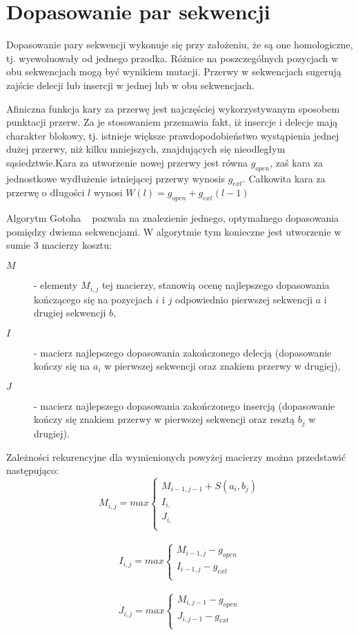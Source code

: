 \documentclass[a4paper,10pt]{article}
\begin{document}
	\section{Dopasowanie par sekwencji}

	Dopasowanie pary sekwencji wykonuje się przy założeniu, że są one homologiczne, tj. wyewoluowały od jednego przodka. Różnice na poszczególnych pozycjach w obu sekwencjach mogą być wynikiem mutacji. Przerwy w sekwencjach sugerują zajście delecji lub insercji w jednej lub w obu sekwencjach.

	Afiniczna funkcja kary za przerwę jest najczęściej wykorzystywanym sposobem punktacji przerw. Za je stosowaniem przemawia fakt, iż insercje i delecje mają charakter blokowy, tj. istnieje większe prawdopodobieństwo wystąpienia jednej dużej przerwy, niż kilku mniejszych, znajdujących się nieodległym sąsiedztwie.Kara za utworzenie nowej przerwy jest równa $g_{open}$, zaś kara za jednostkowe wydłużenie istniejącej przerwy wynosis $g_{ext}$. Całkowita kara za przerwę o długości $l$ wynosi \mbox{$W(l) = g_{open} + g_{ext}(l - 1)$}

	Algorytm Gotoha ~\cite{gotoh} pozwala na znalezienie jednego, optymalnego dopasowania  pomiędzy dwiema sekwencjami. W algorytmie tym konieczne jest utworzenie w sumie 3 macierzy kosztu:
	\begin{description}
	\item[$M$]
	 - elementy $M_{i,j}$ tej macierzy, stanowią ocenę najlepszego dopasowania kończącego się na pozycjach $i$ i $j$ odpowiednio pierwszej sekwencji $a$ i drugiej sekwencji $b$,
	\item[$I$]
	 - macierz najlepszego dopasowania zakończonego delecją (dopasowanie kończy się na $a_i$ w pierwszej sekwencji oraz znakiem przerwy w drugiej),
	\item[$J$]
	 - macierz najlepszego dopasowania zakończonego insercją (dopasowanie kończy się znakiem przerwy w pierwszej sekwencji oraz resztą $b_j$ w drugiej).
	\end{description}
	Zależności rekurencyjne dla wymienionych powyżej macierzy można przedstawić następująco:
	\[
		M_{i,j} = max \left\{
			\begin{array}{ll}
				M_{i-1, j-1} + S(a_i, b_j)\\
				I_{i, }\\
				J_{i, }\\
			\end{array} \right.
	\]\\
	\[
		I_{i,j} = max \left\{
			\begin{array}{ll}
				M_{i-1, j} - g_{open}\\
				I_{i-1, j} - g_{ext}\\
			\end{array} \right.
	\]\\
	\[
		J_{i,j} = max \left\{
			\begin{array}{ll}
				M_{i, j-1} - g_{open}\\
				J_{i, j-1} - g_{ext}\\
			\end{array} \right.
	\]
\end{document}
